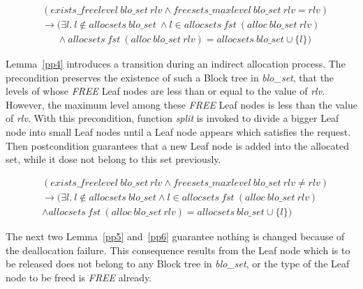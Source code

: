 \begin{lemma} 
\label{pp3}
\end{lemma}
\vspace{-7pt}
{\footnotesize
\begin{align*}
&(exists\_freelevel\ blo\_set\ rlv \wedge freesets\_maxlevel\ blo\_set\ rlv = rlv) \\ &\longrightarrow (\exists l.\ l \notin allocsets\ blo\_set\ \wedge l \in allocsets\ fst\ (alloc\ blo\_set\ rlv) \\
&\ \ \ \ \ \ \ \wedge allocsets\ fst\ (alloc\ blo\_set\ rlv) = allocsets\ blo\_set \cup \lbrace l \rbrace)
\end{align*}
}
\vspace{-12pt}

Lemma~\ref{pp4} introduces a transition during an indirect allocation process. The precondition preserves the existence of such a Block tree in \emph{blo\_set}, that the levels of whose \emph{FREE} Leaf nodes are less than or equal to the value of \emph{rlv}. However, the maximum level among these \emph{FREE} Leaf nodes is less than the value of \emph{rlv}. With this precondition, function \emph{split} is invoked to divide a bigger Leaf node into small Leaf nodes until a Leaf node appears which satisfies the request. Then postcondition guarantees that a new Leaf node is added into the allocated set, while it dose not belong to this set previously.

\begin{lemma} 
\label{pp4}
\end{lemma}
\vspace{-7pt}
{\footnotesize
\begin{align*}
&(exists\_freelevel\ blo\_set\ rlv \wedge freesets\_maxlevel\ blo\_set\ rlv \neq rlv) \\
&\longrightarrow (\exists l.\ l \notin allocsets\ blo\_set \wedge l \in allocsets\ fst\ (alloc\ blo\_set\ rlv) \\
&\wedge allocsets\ fst\ (alloc\ blo\_set\ rlv) = allocsets\ blo\_set \cup \lbrace l \rbrace)
\end{align*}
}
\vspace{-12pt}

The next two Lemma~\ref{pp5} and~\ref{pp6} guarantee nothing is changed because of the deallocation failure. This consequence results from the Leaf node which is to be released does not belong to any Block tree in \emph{blo\_set}, or the type of the Leaf node to be freed is \emph{FREE} already.

